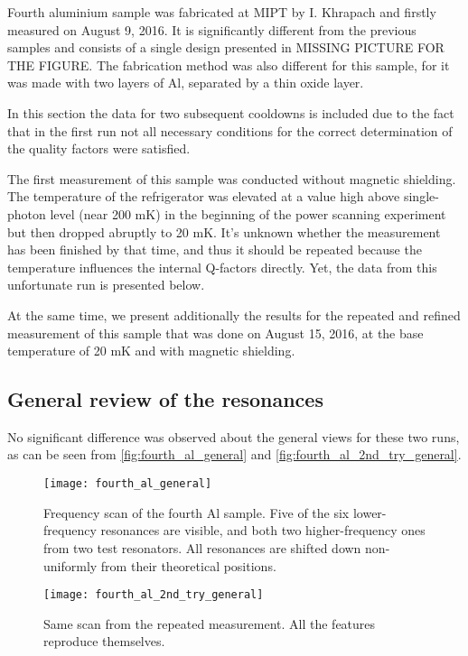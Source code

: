 \documentclass[12pt]{article}
\numberwithin{equation}{section}
\begin{document}
Fourth aluminium sample was fabricated at MIPT by I. Khrapach and firstly measured on August 9, 2016. It is significantly different from the previous samples and consists of a single design presented in MISSING PICTURE FOR THE FIGURE. The fabrication method was also different for this sample, for it was made with two layers of Al, separated by a thin oxide layer.

In this section the data for two subsequent cooldowns is included due to the fact that in the first run not all necessary conditions for the correct determination of the quality factors were satisfied.

The first measurement of this sample was conducted without magnetic shielding. The temperature of the refrigerator was elevated at a value high above single-photon level (near 200 mK) in the beginning of the power scanning experiment but then dropped abruptly to 20 mK. It's unknown whether the measurement has been finished by that time, and thus it should be repeated because the temperature influences the internal Q-factors directly. Yet, the data from this unfortunate run is presented below.

At the same time, we present additionally the results for the repeated and refined measurement of this sample that was done on August 15, 2016, at the base temperature of 20 mK and with magnetic shielding. 

\subsection{General review of the resonances}

No significant difference was observed about the general views for these two runs, as can be seen from \autoref{fig:fourth_al_general} and \autoref{fig:fourth_al_2nd_try_general}.


\begin{figure}[h]
\centering
\texttt{[image: fourth\_al\_general]}
\caption{Frequency scan of the fourth Al sample. Five of the six lower-frequency resonances are visible, and both two higher-frequency ones from two test resonators. All resonances are shifted down non-uniformly from their theoretical positions.}
\label{fig:fourth_al_general}
\end{figure}


\begin{figure}[h]
\centering
\texttt{[image: fourth\_al\_2nd\_try\_general]}
\caption{Same scan from the repeated measurement. All the features reproduce themselves.}
\label{fig:fourth_al_2nd_try_general}
\end{figure}
\end{document}

